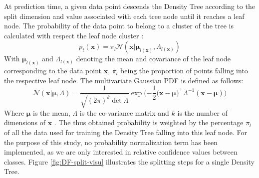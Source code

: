 \documentclass[10pt]{article}
\begin{document}
At prediction time, a given data point descends the Density Tree according to the split dimension and value associated with each tree node until it reaches a leaf node. The probability of the data point to belong to a cluster of the tree is calculated with respect the leaf node cluster \cite{decisionForests-MSR}:
\begin{equation}
    \label{eq:proba_density}
    p_t(\mathbf{x}) = \pi_l\mathcal{N}(\mathbf{x}|\boldsymbol{\mu}_{l(\mathbf{x})},\mathtt{\Lambda}_{l(\mathbf{x})})
\end{equation}
With $\boldsymbol{\mu}_{l(\mathbf{x})}$ and $\mathtt{\Lambda}_{l(\mathbf{x})}$ denoting the mean and covariance of the leaf node corresponding to the data point $\mathbf{x}$, $\pi_l$ being the proportion of points falling into the respective leaf node. The multivariate Gaussian \gls{PDF} is defined as follows:
\begin{equation}
    \label{eq:mv-gaussian}
    \mathcal{N}(\mathbf{x}|\boldsymbol{\mu},\mathtt{\Lambda})=\frac{1}{\sqrt{(2\pi)^k\det\mathtt{\Lambda}}}\exp\Big({-\frac{1}{2}(\mathbf{x}-\boldsymbol{\mu}})^\top\mathtt{\Lambda}^{-1}(\mathbf{x}-\boldsymbol{\mu})\Big)
\end{equation}
Where $\boldsymbol{\mu}$ is the mean, $\mathtt{\Lambda}$ is the co-variance matrix and $k$ is the number of dimensions of $\mathbf{x}$ \cite{scipy}. The thus obtained probability is weighted by the percentage $\pi_l$ of all the data used for training the Density Tree falling into this leaf node. For the purpose of this study, no probability normalization term has been implemented, as we are only interested in relative confidence values between classes. Figure \ref{fig:DF-split-visu} illustrates the splitting steps for a single Density Tree. 
\end{document}
